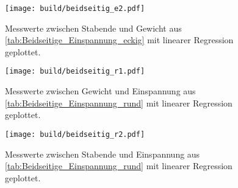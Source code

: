 \begin{figure}%
    \centering
    \texttt{[image: build/beidseitig\_e2.pdf]}
    \caption{Messwerte zwischen Stabende und Gewicht aus \autoref{tab:Beidseitige_Einspannung_eckig} mit linearer Regression geplottet.}
    \label{fig:eckig_beidseitig2}
\end{figure}
\begin{figure}%
    \centering
    \texttt{[image: build/beidseitig\_r1.pdf]}
    \caption{Messwerte zwischen Gewicht und Einspannung aus \autoref{tab:Beidseitige_Einspannung_rund} mit linearer Regression geplottet.}
    \label{fig:rund_beidseitig1}
\end{figure}
\newpage
\begin{figure}%
    \centering
    \texttt{[image: build/beidseitig\_r2.pdf]}
    \caption{Messwerte zwischen Stabende und Einspannung aus \autoref{tab:Beidseitige_Einspannung_rund} mit linearer Regression geplottet.}
    \label{fig:rund_beidseitig2}
\end{figure}

